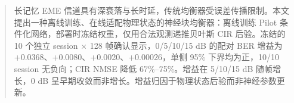 \begin{abstract}
长记忆 EME 信道具有深衰落与长时延，传统均衡器受误差传播限制。本文提出一种离线训练、在线适配物理状态的神经块均衡器：离线训练 Pilot 条件化网络，部署时冻结权重，仅用合法观测递推贝叶斯 CIR 后验。冻结的 10 个独立 session × 128 帧确认显示，0/5/10/15 dB 的配对 BER 增益为 +0.0368、+0.0080、+0.0020、+0.00026，单侧 95\% 下界均为正，10/10 session 无负向；CIR NMSE 降低 67\%–75\%。增益在 5/10/15 dB 随帧增长，0 dB 呈早期收敛而非增长。增益归因于物理状态后验而非神经参数更新。
\end{abstract}
